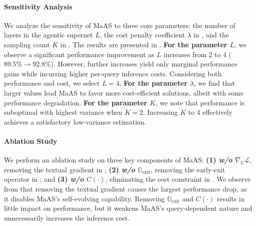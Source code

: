 \documentclass{article}
\theoremstyle{plain}
\theoremstyle{definition}
\theoremstyle{remark}
\newcommand{\ourmethod}{{{MaAS}}\xspace}
\begin{document}
\paragraph{Sensitivity Analysis} We analyze the sensitivity of \ourmethod to three core parameters: the number of layers in the agentic supernet $L$, the cost penalty coefficient $\lambda$ in , and the sampling count $K$ in . The results are presented in . 
\textbf{For the parameter $L$}, we observe a significant performance improvement as $L$ increases from 2 to 4 ($89.5\% \rightarrow 92.8\%$). However, further increases yield only marginal performance gains while incurring higher per-query inference costs. Considering both performance and cost, we select $L = 4$. 
\textbf{For the parameter $\lambda$}, we find that larger values lead \ourmethod to favor more cost-efficient solutions, albeit with some performance degradation. 
\textbf{For the parameter $K$}, we note that performance is suboptimal with highest variance when $K = 2$. Increasing $K$ to 4 effectively achieves a satisfactory low-variance estimation.

\vspace{-0.9em}
\paragraph{Ablation Study} We perform an ablation study on three key components of \ourmethod: \textbf{(1) \textit{w/o} $\nabla_\mathbb{O}\mathcal{L}$}, removing the textual gradient in ; \textbf{(2) \textit{w/o} $\mathbb{O}_\text{exit}$}, removing the early-exit operator in ; and \textbf{(3) \textit{w/o} $C(\cdot)$}, eliminating the cost constraint in . 
We observe from  that removing the textual gradient causes the largest performance drop, as it disables \ourmethod's self-evolving capability. Removing $\mathbb{O}_\text{exit}$ and $C(\cdot)$ results in little impact on performance, but it weakens \ourmethod's query-dependent nature and unnecessarily increases the inference cost.
\end{document}
